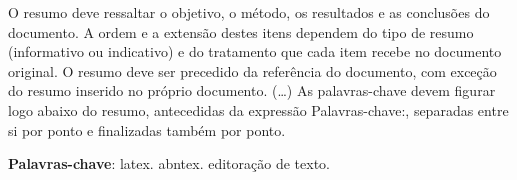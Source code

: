 \setlength{\absparsep}{18pt} %
\begin{resumo}
 O resumo deve ressaltar o
 objetivo, o método, os resultados e as conclusões do documento. A ordem e a extensão
 destes itens dependem do tipo de resumo (informativo ou indicativo) e do
 tratamento que cada item recebe no documento original. O resumo deve ser
 precedido da referência do documento, com exceção do resumo inserido no
 próprio documento. (\ldots) As palavras-chave devem figurar logo abaixo do
 resumo, antecedidas da expressão Palavras-chave:, separadas entre si por
 ponto e finalizadas também por ponto.

 \textbf{Palavras-chave}: latex. abntex. editoração de texto.
\end{resumo}